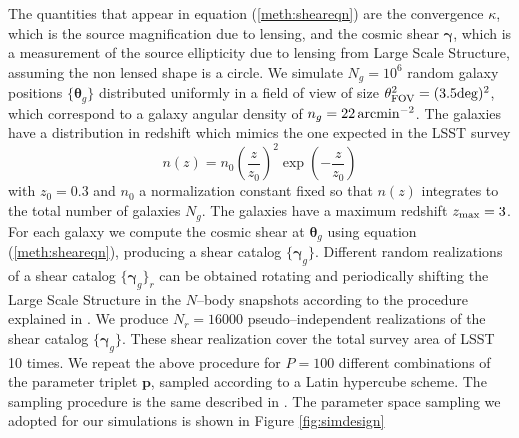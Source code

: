 \documentclass[reprint,aps,prd,superscriptaddress,showkeys,showpacs]{revtex4-1}
\newcommand{\bb}[1]{\mathbf{#1}}
\begin{document}
%
The quantities that appear in equation (\ref{meth:sheareqn}) are the convergence $\kappa$, which is the source magnification due to lensing, and the cosmic shear $\pmb{\gamma}$, which is a measurement of the source ellipticity due to lensing from Large Scale Structure, assuming the non lensed shape is a circle. 
We simulate $N_g = 10^6$ random galaxy positions $\{\pmb{\theta}_g\}$ distributed uniformly in a field of view of size $\theta_{\rm FOV}^2=(3.5{\rm deg})^2$, which correspond to a galaxy angular density of $n_g=22\,\rm{arcmin}^{-2}$. The galaxies have a distribution in redshift which mimics the one expected in the LSST survey
\begin{equation}
\label{meth:galdistr}
n(z) = n_0\left(\frac{z}{z_0}\right)^2\exp\left(-\frac{z}{z_0}\right)
\end{equation}  
%
with $z_0=0.3$ and $n_0$ a normalization constant fixed so that $n(z)$ integrates to the total number of galaxies $N_g$. The galaxies have a maximum redshift $z_{\rm max}=3$. For each galaxy we compute the cosmic shear at $\pmb{\theta}_g$ using equation (\ref{meth:sheareqn}), producing a shear catalog $\{\pmb{\gamma}_g\}$. Different random realizations of a shear catalog $\{\pmb{\gamma}_g\}_r$ can be obtained rotating and periodically shifting the Large Scale Structure in the $N$--body snapshots according to the procedure explained in \citep{PetriVariance}. We produce $N_r=16000$ pseudo--independent realizations of the shear catalog $\{\pmb{\gamma}_g\}$. These shear realization cover the total survey area of LSST 10 times.
We repeat the above procedure for $P=100$ different combinations of the parameter triplet $\bb{p}$, sampled according to a Latin hypercube scheme. The sampling procedure is the same described in \citep{CFHTMink,CFHTPeaks}. The parameter space sampling we adopted for our simulations is shown in Figure \ref{fig:simdesign}
\end{document}
